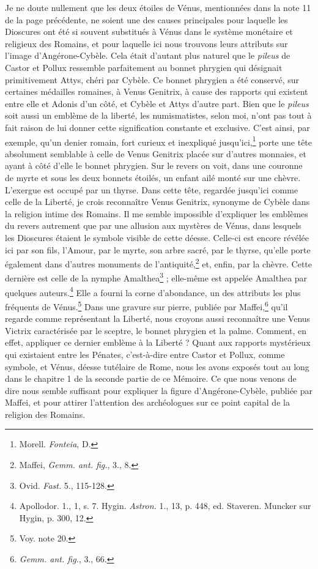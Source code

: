 \documentclass[a4paper, 11pt, oneside, polutonikogreek, french]{article}
\begin{document}
Je ne doute nullement que les deux étoiles de Vénus, mentionnées dans la note 11 de la page précédente, ne soient une des causes principales pour laquelle les Dioscures ont été si souvent substitués à Vénus dans le système monétaire et religieux des Romains, et pour laquelle ici nous trouvons leurs attributs sur l'image d'Angérone-Cybèle. Cela était d'autant plus naturel que le \emph{pileus} de Castor et Pollux ressemble parfaitement au bonnet phrygien qui désignait primitivement Attys, chéri par Cybèle. Ce bonnet phrygien a été conservé, sur certaines médailles romaines, à Venus Genitrix, à cause des rapports qui existent entre elle et Adonis d'un côté, et Cybèle et Attys d'autre part. Bien que le \emph{pileus} soit aussi un emblème de la liberté, les numismatistes, selon moi, n'ont pas tout à fait raison de lui donner cette signification constante et exclusive. C'est ainsi, par exemple, qu'un denier romain, fort curieux et inexpliqué jusqu'ici,\footnote{Morell. \emph{Fonteia}, D.} porte une tête absolument semblable à celle de Venus Genitrix placée sur d'autres monnaies, et ayant à côté d'elle le bonnet phrygien. Sur le revers on voit, dans une couronne de myrte et sous les deux bonnets étoilés, un enfant ailé monté sur une chèvre. L'exergue est occupé par un thyrse. Dans cette tête, regardée jusqu'ici comme celle de la Liberté, je crois reconnaître Venus Genitrix, synonyme de Cybèle dans la religion intime des Romains. Il me semble impossible d'expliquer les emblèmes du revers autrement que par une allusion aux mystères de Vénus, dans lesquels les Dioscures étaient le symbole visible de cette déesse. Celle-ci est encore révélée ici par son fils, l'Amour, par le myrte, son arbre sacré, par le thyrse, qu'elle porte également dans d'autres monuments de l'antiquité,\footnote{Maffei, \emph{Gemm. ant. fig.}, 3., 8.} et, enfin, par la chèvre. Cette dernière est celle de la nymphe Amalthea\footnote{Ovid. \emph{Fast.} 5., 115-128.} ; elle-même est appelée Amalthea par quelques auteurs.\footnote{Apollodor. 1., 1, s. 7. Hygin. \emph{Astron.} 1., 13, p. 448, ed. Staveren. Muncker sur Hygin, p. 300, 12.} Elle a fourni la corne d'abondance, un des attributs les plus fréquents de Vénus.\footnote{Voy. note 20.} Dans une gravure sur pierre, publiée par Maffei,\footnote{\emph{Gemm. ant. fig.}, 3., 66.} qu'il regarde comme représentant la Liberté, nous croyons aussi reconnaître une Venus Victrix caractérisée par le sceptre, le bonnet phrygien et la palme. Comment, en effet, appliquer ce dernier emblème à la Liberté ? Quant aux rapports mystérieux qui existaient entre les Pénates, c'est-à-dire entre Castor et Pollux, comme symbole, et Vénus, déesse tutélaire de Rome, nous les avons exposés tout au long dans le chapitre 1 de la seconde partie de ce Mémoire. Ce que nous venons de dire nous semble suffisant pour expliquer la figure d'Angérone-Cybèle, publiée par Maffei, et pour attirer l'attention des archéologues sur ce point capital de la religion des Romains.
\end{document}
